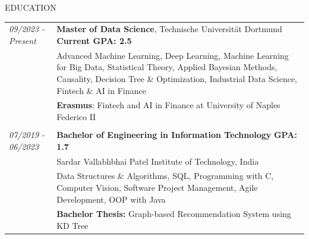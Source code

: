 \documentclass{resume} %
\begin{document}
\begin{rSection}{EDUCATION}

\begin{tabular}{@{}p{}p{}@{}}
   \textit{09/2023 - Present}
   & {\bf Master of Data Science}, Technische Universität Dortmund
   \hfill \textbf{Current GPA: 2.5} \\

   & Advanced Machine Learning, Deep Learning, Machine Learning for Big Data, Statistical Theory, Applied Bayesian Methods, Causality, Decision Tree \& Optimization, Industrial Data Science, Fintech \& AI in Finance \\
    & \textbf{Erasmus}: Fintech and AI in Finance at University of Naples Federico II \\
   & \\[-0.8em]

   \textit{07/2019 - 06/2023}
   & {\bf Bachelor of Engineering in Information Technology}
   \hfill \textbf{GPA: 1.7} \\

   & Sardar Vallabhbhai Patel Institute of Technology, India \\
   & Data Structures \& Algorithms, SQL, Programming with C, Computer Vision, Software Project Management, Agile Development, OOP with Java \\
   & \textbf{Bachelor Thesis:} Graph-based Recommendation System using KD Tree
\end{tabular}

\end{rSection}
\end{document}
